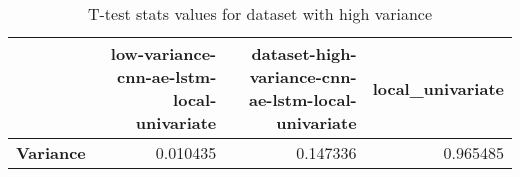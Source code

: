 \begin{table}[h]
\centering
\caption{T-test stats values for dataset with high variance}
\label{table:ttest-p_values-variance}
\begin{tabular}{lrrr}
\toprule
{} &  low-variance-cnn-ae-lstm-local-univariate &  dataset-high-variance-cnn-ae-lstm-local-univariate &  local\_univariate \\
\midrule
\textbf{Variance} &                                   0.010435 &                                           0.147336 &          0.965485 \\
\bottomrule
\end{tabular}
\end{table}
